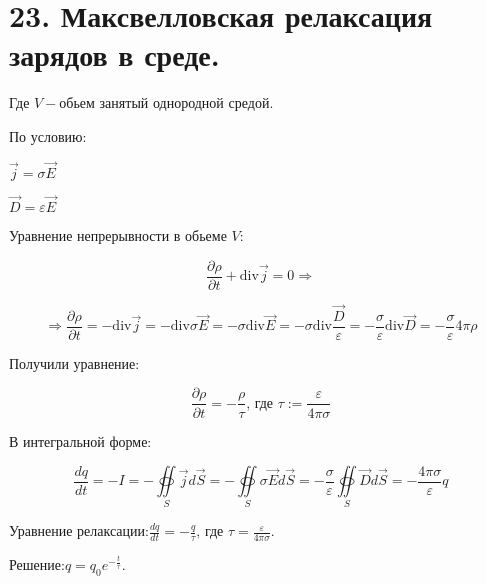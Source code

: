 \section*{23. Максвелловская релаксация зарядов в среде.}
 


Где $V-$обьем занятый однородной средой.

По условию:

\(  \vec{j}=\sigma\vec{E}\)

\( \vec{D}=\varepsilon\vec{E} \) 

Уравнение непрерывности в обьеме $V$:

\[\frac{\partial\rho}{\partial t} +\mathrm{div}\vec{j}=0 \Rightarrow \]

\[\Rightarrow\frac{\partial\rho}{\partial t} =-\mathrm{div}\vec{j}=-\mathrm{div}\sigma\vec{E}=-\sigma \mathrm{div}\vec{E}=-\sigma \mathrm{div} \frac{\vec{D}}{\varepsilon}=-\frac{\sigma}{\varepsilon} \mathrm{div}\vec{D}=-\frac{\sigma}{\varepsilon}4\pi\rho   \]

Получили уравнение:

\[\frac{\partial \rho}{\partial t}=-\frac{\rho}{\tau} \text{, где }\tau:=\frac{\varepsilon}{4\pi\sigma}   \]

В интегральной форме:

\[\frac{dq}{dt}=-I=-\underset{S}{\oiint}\vec{j}d\vec{S}=-\underset{S}{\oiint}\sigma\vec{E}d\vec{S}= -\frac{\sigma}{\varepsilon}\underset{S}{\oiint}\vec{D}d\vec{S}=-\frac{4\pi \sigma}{\varepsilon}q  \]

Уравнение релаксации:$\boxed{ \frac{dq}{dt}=-\frac{q}{\tau} }\text{, где }\tau= \frac{\varepsilon}{4\pi\sigma}.$

Решение:$q=q_0e^{-\frac{t}{\tau}}.$
